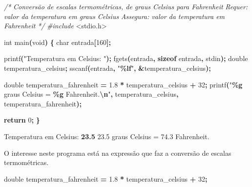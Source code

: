 \documentclass[
  11pt,
  a4paper,
]{scrbook}
\newenvironment{Shaded}{\begin{snugshade}}{\end{snugshade}}
\newcommand{\CommentTok}[1]{\textcolor[rgb]{0.56,0.35,0.01}{\textit{#1}}}
\newcommand{\ControlFlowTok}[1]{\textcolor[rgb]{0.13,0.29,0.53}{\textbf{#1}}}
\newcommand{\DataTypeTok}[1]{\textcolor[rgb]{0.13,0.29,0.53}{#1}}
\newcommand{\DecValTok}[1]{\textcolor[rgb]{0.00,0.00,0.81}{#1}}
\newcommand{\FloatTok}[1]{\textcolor[rgb]{0.00,0.00,0.81}{#1}}
\newcommand{\ImportTok}[1]{#1}
\newcommand{\KeywordTok}[1]{\textcolor[rgb]{0.13,0.29,0.53}{\textbf{#1}}}
\newcommand{\NormalTok}[1]{#1}
\newcommand{\OperatorTok}[1]{\textcolor[rgb]{0.81,0.36,0.00}{\textbf{#1}}}
\newcommand{\PreprocessorTok}[1]{\textcolor[rgb]{0.56,0.35,0.01}{\textit{#1}}}
\newcommand{\SpecialCharTok}[1]{\textcolor[rgb]{0.81,0.36,0.00}{\textbf{#1}}}
\newcommand{\StringTok}[1]{\textcolor[rgb]{0.31,0.60,0.02}{#1}}
\begin{document}
\begin{Shaded}
\begin{Highlighting}[]
\CommentTok{/* }
\CommentTok{Conversão de escalas termométricas, de graus Celsius para Fahrenheit}
\CommentTok{Requer: valor da temperatura em graus Celsius}
\CommentTok{Assegura: valor da temperatura em Fahrenheit}
\CommentTok{*/}
\PreprocessorTok{\#include }\ImportTok{\textless{}stdio.h\textgreater{}}

\DataTypeTok{int}\NormalTok{ main}\OperatorTok{(}\DataTypeTok{void}\OperatorTok{)} \OperatorTok{\{}
    \DataTypeTok{char}\NormalTok{ entrada}\OperatorTok{[}\DecValTok{160}\OperatorTok{];}

\NormalTok{    printf}\OperatorTok{(}\StringTok{"Temperatura em Celsius: "}\OperatorTok{);}
\NormalTok{    fgets}\OperatorTok{(}\NormalTok{entrada}\OperatorTok{,} \KeywordTok{sizeof}\NormalTok{ entrada}\OperatorTok{,}\NormalTok{ stdin}\OperatorTok{);}
    \DataTypeTok{double}\NormalTok{ temperatura\_celsius}\OperatorTok{;}
\NormalTok{    sscanf}\OperatorTok{(}\NormalTok{entrada}\OperatorTok{,} \StringTok{"}\SpecialCharTok{\%lf}\StringTok{"}\OperatorTok{,} \OperatorTok{\&}\NormalTok{temperatura\_celsius}\OperatorTok{);}

    \DataTypeTok{double}\NormalTok{ temperatura\_fahrenheit }\OperatorTok{=} \FloatTok{1.8} \OperatorTok{*}\NormalTok{ temperatura\_celsius }\OperatorTok{+} \DecValTok{32}\OperatorTok{;}
\NormalTok{    printf}\OperatorTok{(}\StringTok{"}\SpecialCharTok{\%g}\StringTok{ graus Celsius = }\SpecialCharTok{\%g}\StringTok{ Fahrenheit.}\SpecialCharTok{\textbackslash{}n}\StringTok{"}\OperatorTok{,}\NormalTok{ temperatura\_celsius}\OperatorTok{,}
\NormalTok{        temperatura\_fahrenheit}\OperatorTok{);}

    \ControlFlowTok{return} \DecValTok{0}\OperatorTok{;}
\OperatorTok{\}}
\end{Highlighting}
\end{Shaded}

\begin{Shaded}
\begin{Highlighting}[]
\NormalTok{Temperatura em Celsius: }\KeywordTok{ 23.5 }
\NormalTok{23.5 graus Celsius = 74.3 Fahrenheit.}
\end{Highlighting}
\end{Shaded}

O interesse neste programa está na expressão que faz a conversão de
escalas termométricas.

\begin{Shaded}
\begin{Highlighting}[]
\DataTypeTok{double}\NormalTok{ temperatura\_fahrenheit }\OperatorTok{=} \FloatTok{1.8} \OperatorTok{*}\NormalTok{ temperatura\_celsius }\OperatorTok{+} \DecValTok{32}\OperatorTok{;}
\end{Highlighting}
\end{Shaded}
\end{document}
